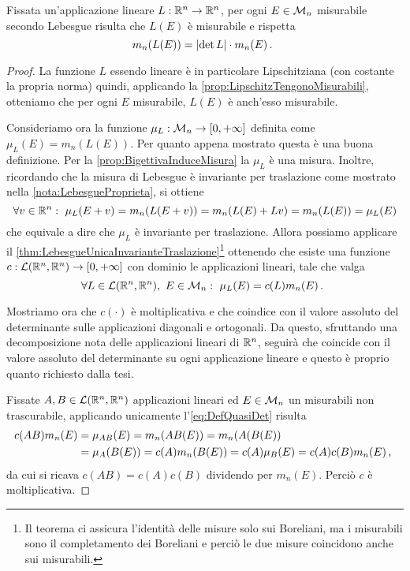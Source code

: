 \begin{proposition}\label{prop:MisuraImmagineLineare}
	Fissata un'applicazione lineare $L:\mathbb R^n\to\mathbb R^n$, per ogni $E\in\mathcal M_n$ misurabile secondo Lebesgue risulta che $L(E)$ è misurabile e rispetta
	\begin{equation}
		m_n(L(E))=\lvert \det L\rvert\cdot m_n(E)\, \text{. }
	\end{equation}
\end{proposition}
\begin{proof}
	La funzione $L$ essendo lineare è in particolare Lipschitziana (con costante la propria norma) quindi, applicando la \cref{prop:LipschitzTengonoMisurabili}, otteniamo che per ogni $E$ misurabile, $L(E)$ è anch'esso misurabile.
	
	Consideriamo ora la funzione $\mu_L:\mathcal M_n\to[0,+\infty]$ definita come $\mu_L(E)=m_n(L(E))$. Per quanto appena mostrato questa è una buona definizione.
	Per la \cref{prop:BigettivaInduceMisura} la $\mu_L$ è una misura.
	Inoltre, ricordando che la misura di Lebesgue è invariante per traslazione come mostrato nella \cref{nota:LebesgueProprieta}, si ottiene
	\begin{equation*}
		\forall v\in\R^n:\ \mu_L(E+v)=m_n(L(E+v))=m_n(L(E)+Lv)=m_n(L(E))=\mu_L(E)
	\end{equation*}
	che equivale a dire che $\mu_L$ è invariante per traslazione.
	\newcommand{\linR}{\ensuremath{\mathcal L(\R^n,\R^n)}}
	Allora possiamo applicare il \cref{thm:LebesgueUnicaInvarianteTraslazione}\footnote{Il teorema ci assicura l'identità delle misure solo sui Boreliani, ma i misurabili sono il completamento dei Boreliani e perciò le due misure coincidono anche sui misurabili.} ottenendo che esiste una funzione $c:\linR\to\Rpiu$ con dominio le applicazioni lineari, tale che valga
	\begin{equation}\label{eq:DefQuasiDet}
		\forall L\in \linR,\ E\in\M_n:\ \mu_L(E)=c(L)m_n(E)\punto
	\end{equation}
	
	Mostriamo ora che $c(\cdot)$ è moltiplicativa e che coindice con il valore assoluto del determinante sulle applicazioni diagonali e ortogonali. Da questo, sfruttando una decomposizione nota delle applicazioni lineari di $\mathbb R^n$, seguirà che coincide con il valore assoluto del determinante su ogni applicazione lineare e questo è proprio quanto richiesto dalla tesi. 
	
	Fissate $A,B\in \linR$ applicazioni lineari ed $E\in\mathcal M_n$ un misurabili non trascurabile, applicando unicamente l'\cref{eq:DefQuasiDet} risulta
	\begin{align*}
		c(AB)m_n(E)&=\mu_{AB}(E)=m_n(AB(E))=m_n(A(B(E))\\
		&=\mu_A(B(E))=c(A)m_n(B(E))=c(A)\mu_B(E)=c(A)c(B)m_n(E)\, \text{, }
	\end{align*}
	da cui si ricava $c(AB)=c(A)c(B)$ dividendo per $m_n(E)$. Perciò $c$ è moltiplicativa.
	

\end{proof}
